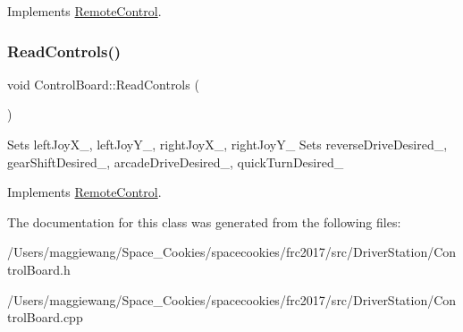Implements \hyperlink{class_remote_control}{Remote\+Control}.

\mbox{\label{class_control_board_abc38ec1feb7a7c38adfe7ced04fc5a79}} 
\subsubsection{\texorpdfstring{Read\+Controls()}{ReadControls()}}
{\footnotesize\ttfamily void Control\+Board\+::\+Read\+Controls (\begin{DoxyParamCaption}{ }\end{DoxyParamCaption})\hspace{0.3cm}{\ttfamily [virtual]}}

Sets left\+Joy\+X\+\_\+, left\+Joy\+Y\+\_\+, right\+Joy\+X\+\_\+, right\+Joy\+Y\+\_\+ Sets reverse\+Drive\+Desired\+\_\+, gear\+Shift\+Desired\+\_\+, arcade\+Drive\+Desired\+\_\+, quick\+Turn\+Desired\+\_\+ 

Implements \hyperlink{class_remote_control}{Remote\+Control}.



The documentation for this class was generated from the following files\+:\begin{DoxyCompactItemize}
\item 
/\+Users/maggiewang/\+Space\+\_\+\+Cookies/spacecookies/frc2017/src/\+Driver\+Station/Control\+Board.\+h\item 
/\+Users/maggiewang/\+Space\+\_\+\+Cookies/spacecookies/frc2017/src/\+Driver\+Station/Control\+Board.\+cpp\end{DoxyCompactItemize}
